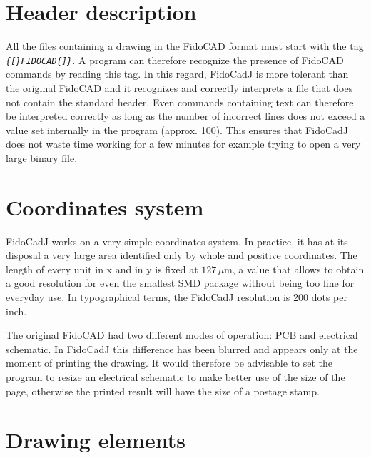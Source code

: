 \documentclass[10pt,a4paper,twoside]{scrreprt}
\newcommand{\micron}{\,\mu\mathrm{m}}
\begin{document}
\section{Header description}

All the files containing a drawing in the FidoCAD \emph{}
format must start with the tag \emph{\lstinline!{[}FIDOCAD{]}!.}
A program can therefore recognize the presence of FidoCAD commands
by reading this tag. In this regard, FidoCadJ is more tolerant
than the original FidoCAD \emph{} and it recognizes
and correctly interprets a file that does not contain the standard
header\emph{}. Even commands containing text can therefore
be interpreted correctly as long as the number of incorrect
lines does not exceed a value set internally in the program (approx.
100). This ensures that FidoCadJ does not waste time working for a
few minutes for example trying to open a very large binary file.


\section{Coordinates system}

FidoCadJ works on a very simple coordinates system\emph{}.
In practice, it has at its disposal a very large area identified only
by whole and positive coordinates. The length of every unit in x and
in y is fixed at \emph{$127\micron$}, a value that allows to obtain
a good resolution for even the smallest SMD package without being
too fine for everyday use. In typographical terms, the FidoCadJ resolution is 200 dots per inch.

The original FidoCAD\emph{} had two different modes
of operation: PCB\emph{} and electrical
schematic. In FidoCadJ this difference
has been blurred and appears only at the moment of printing the drawing.
It would therefore be advisable to set the program to resize an electrical
schematic to make better use of the size of the page, otherwise the printed result will have the size of a postage stamp.

\section{Drawing elements}
\end{document}
